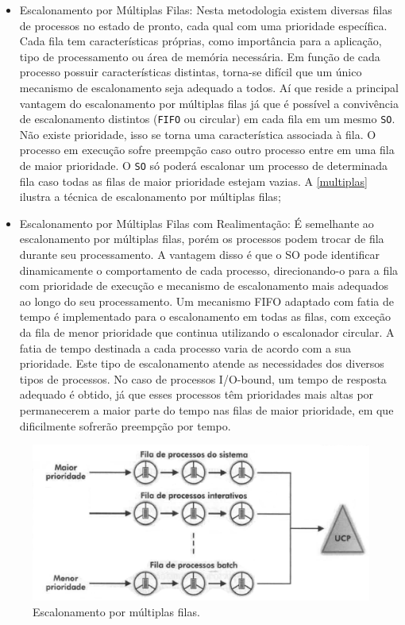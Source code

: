 \begin{itemize}
	\item Escalonamento por Múltiplas Filas:
Nesta metodologia existem diversas filas de processos no estado de pronto, cada qual com uma prioridade específica. Cada fila tem características próprias, como importância para a aplicação, tipo de processamento ou área de memória necessária. Em função de cada processo possuir características distintas, torna-se difícil que um único mecanismo de escalonamento seja adequado a todos. Aí que reside a principal vantagem do escalonamento por múltiplas filas já que é possível a convivência de escalonamento distintos (\texttt{FIFO} ou circular) em cada fila em um mesmo \texttt{SO}. Não existe prioridade, isso se torna uma característica associada à fila. O processo em execução sofre preempção caso outro processo entre em uma fila de maior prioridade. O \texttt{SO} só poderá escalonar um processo de determinada fila caso todas as filas de maior prioridade estejam vazias. A \autoref{multiplas} ilustra a técnica de escalonamento por múltiplas filas;
	\item Escalonamento por Múltiplas Filas com Realimentação:
É semelhante ao escalonamento por múltiplas filas, porém os processos podem trocar de fila durante seu processamento. A vantagem disso é que o SO pode identificar dinamicamente o comportamento de cada processo, direcionando-o para a fila com prioridade de execução e mecanismo de escalonamento mais adequados ao longo do seu processamento. Um mecanismo FIFO adaptado com fatia de tempo é implementado para o escalonamento em todas as filas, com exceção da fila de menor prioridade que continua utilizando o escalonador circular. A fatia de tempo destinada a cada processo varia de acordo com a sua prioridade. Este tipo de escalonamento atende as necessidades dos diversos tipos de processos. No caso de processos I/O-bound, um tempo de resposta adequado é obtido, já que esses processos têm prioridades mais altas por permanecerem a maior parte do tempo nas filas de maior prioridade, em que dificilmente sofrerão preempção por tempo. 

\end{itemize}

\begin{figure}[h]
	\centering
	\caption{\label{multiplas}Escalonamento por múltiplas filas.}
		\includegraphics[keepaspectratio=true,scale=0.5]{figuras/multiplas.eps}
\end{figure}

